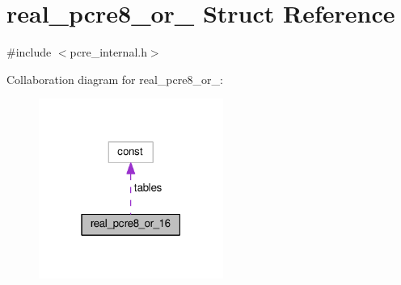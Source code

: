 \hypertarget{structreal__pcre8__or__16}{}\section{real\+\_\+pcre8\+\_\+or\+\_ Struct Reference}
\label{structreal__pcre8__or__16}


{\ttfamily \#include $<$pcre\+\_\+internal.\+h$>$}



Collaboration diagram for real\+\_\+pcre8\+\_\+or\+\_\+:
\nopagebreak
\begin{figure}[H]
\begin{center}
\leavevmode
\includegraphics[width=171pt]{structreal__pcre8__or__16__coll__graph}
\end{center}
\end{figure}
